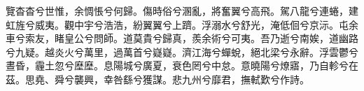 
\begin{pinyinscope}
覽杳杳兮世惟，余惆悵兮何歸。傷時俗兮溷亂，將奮翼兮高飛。駕八龍兮連蜷，建虹旌兮威夷。觀中宇兮浩浩，紛翼翼兮上躋。浮溺水兮舒光，淹低佪兮京沶。屯余車兮索友，睹皇公兮問師。道莫貴兮歸真，羨余術兮可夷。吾乃逝兮南娭，道幽路兮九疑。越炎火兮萬里，過萬首兮嶷嶷。濟江海兮蟬蛻，絕北梁兮永辭。浮雲鬱兮晝昏，霾土忽兮塺塺。息陽城兮廣夏，衰色罔兮中怠。意曉陽兮燎寤，乃自軫兮在茲。思堯、舜兮襲興，幸咎繇兮獲謀。悲九州兮靡君，撫軾歎兮作詩。


\end{pinyinscope}